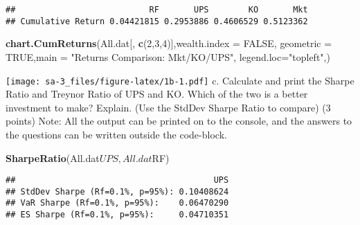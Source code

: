 \documentclass[]{article}
\newenvironment{Shaded}{\begin{snugshade}}{\end{snugshade}}
\newcommand{\KeywordTok}[1]{\textcolor[rgb]{0.13,0.29,0.53}{\textbf{{#1}}}}
\newcommand{\DataTypeTok}[1]{\textcolor[rgb]{0.13,0.29,0.53}{{#1}}}
\newcommand{\DecValTok}[1]{\textcolor[rgb]{0.00,0.00,0.81}{{#1}}}
\newcommand{\StringTok}[1]{\textcolor[rgb]{0.31,0.60,0.02}{{#1}}}
\newcommand{\OtherTok}[1]{\textcolor[rgb]{0.56,0.35,0.01}{{#1}}}
\newcommand{\NormalTok}[1]{{#1}}
\begin{document}
\begin{Shaded}
\end{Shaded}

\begin{verbatim}
##                           RF       UPS        KO       Mkt
## Cumulative Return 0.04421815 0.2953886 0.4606529 0.5123362
\end{verbatim}

\begin{Shaded}
\begin{Highlighting}[]
\KeywordTok{chart.CumReturns}\NormalTok{(All.dat[, }\KeywordTok{c}\NormalTok{(}\DecValTok{2}\NormalTok{,}\DecValTok{3}\NormalTok{,}\DecValTok{4}\NormalTok{)],}\DataTypeTok{wealth.index =} \OtherTok{FALSE}\NormalTok{, }\DataTypeTok{geometric =} \OtherTok{TRUE}\NormalTok{,}\DataTypeTok{main =} \StringTok{"Returns Comparison: Mkt/KO/UPS"}\NormalTok{, }\DataTypeTok{legend.loc=}\StringTok{"topleft"}\NormalTok{,)}
\end{Highlighting}
\end{Shaded}

\texttt{[image: sa-3\_files/figure-latex/1b-1.pdf]} c. Calculate and
print the Sharpe Ratio and Treynor Ratio of UPS and KO. Which of the two
is a better investment to make? Explain. (Use the StdDev Sharpe Ratio to
compare) (3 points) Note: All the output can be printed on to the
console, and the answers to the questions can be written outside the
code-block.

\begin{Shaded}
\begin{Highlighting}[]
\KeywordTok{SharpeRatio}\NormalTok{(All.dat$UPS,All.dat$RF)}
\end{Highlighting}
\end{Shaded}

\begin{verbatim}
##                                        UPS
## StdDev Sharpe (Rf=0.1%, p=95%): 0.10408624
## VaR Sharpe (Rf=0.1%, p=95%):    0.06470290
## ES Sharpe (Rf=0.1%, p=95%):     0.04710351
\end{verbatim}
\end{document}

